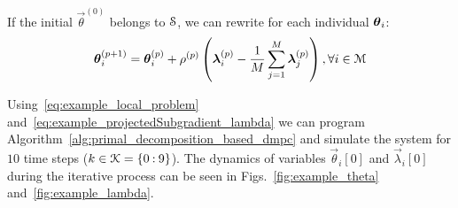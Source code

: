 \documentclass[../main.tex]{subfiles}
\begin{document}
If the initial ${\vec{\theta}}^{(0)}$ belongs to $\mathcal{S}$, we can rewrite for each individual $\boldsymbol{\theta}_i$:
\begin{equation}
  \label{eq:example_projectedSubgradient_lambda}
 \boldsymbol{\theta}_i^{(p+1)}=\boldsymbol{\theta}_i^{(p)}+\rho^{(p)}\left(\boldsymbol{\lambda}_i^{(p)}-\frac{1}{M}\sum_{j=1}^{M}\boldsymbol{\lambda}_j^{(p)}\right),\forall i\in\mathcal{M}
\end{equation}

Using~\eqref{eq:example_local_problem} and~\eqref{eq:example_projectedSubgradient_lambda}
we can program Algorithm~\ref{alg:primal_decomposition_based_dmpc} and simulate the system for $10$ time steps (${k\in\mathcal{K}=\{0\mathbin{:}9\}}$).
The dynamics of variables $\vec{\theta}_{i}[0]$ and $\vec{\lambda}_{i}[0]$ during the iterative process can be seen in Figs.~\ref{fig:example_theta} and~\ref{fig:example_lambda}.
\end{document}
